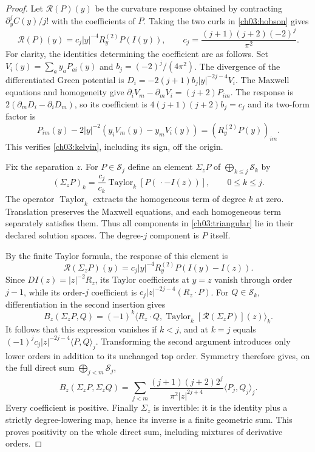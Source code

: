 \begin{proof}
Let $\mathcal R(P)(y)$ be the curvature response obtained by contracting
$\partial_y^j C(y)/j!$ with the coefficients of $P$. Taking the two
curls in \eqref{ch03:hobson} gives
\begin{equation}\label{ch03:kelvin}
 \mathcal R(P)(y)=c_j|y|^{-4}R_y^{(2)}P(I(y)),
 \qquad c_j=\frac{(j+1)(j+2)(-2)^j}{\pi^2}.
\end{equation}
For clarity, the identities determining the coefficient are as follows.
Set $V_i(y)=\sum_a y_aP_{ai}(y)$ and
$b_j=(-2)^j/(4\pi^2)$. The divergence of the differentiated Green
potential is
$D_i=-2(j+1)b_j|y|^{-2j-4}V_i$.
The Maxwell equations and homogeneity give
$\partial_iV_m-\partial_mV_i=(j+2)P_{im}$.
The response is $2(\partial_mD_i-\partial_iD_m)$, so its coefficient
is $4(j+1)(j+2)b_j=c_j$ and its two-form factor is
\[
 P_{im}(y)-2|y|^{-2}(y_iV_m(y)-y_mV_i(y))
   =(R_y^{(2)}P(y))_{im}.
\]
This verifies \eqref{ch03:kelvin}, including its sign, off the origin.

Fix the separation $z$. For $P\in\mathcal S_j$ define an element
$\Sigma_zP$ of $\bigoplus_{k\le j}\mathcal S_k$ by
\begin{equation}\label{ch03:triangular}
 (\Sigma_zP)_k
   =\frac{c_j}{c_k}\operatorname{Taylor}_k[P(\,\cdot-I(z))],
 \qquad 0\le k\le j.
\end{equation}
The operator $\operatorname{Taylor}_k$ extracts the homogeneous term of
degree $k$ at zero. Translation preserves the Maxwell equations, and
each homogeneous term separately satisfies them. Thus all components in
\eqref{ch03:triangular} lie in their declared solution spaces.
The degree-$j$ component is $P$ itself.

By the finite Taylor formula, the response of this element is
\[
 \mathcal R(\Sigma_zP)(y)
   =c_j|y|^{-4}R_y^{(2)}P(I(y)-I(z)).
\]
Since $DI(z)=|z|^{-2}R_z$, its Taylor coefficients at $y=z$ vanish
through order $j-1$, while its order-$j$ coefficient is
$c_j|z|^{-2j-4}(R_z\cdot P)$.
For $Q\in\mathcal S_k$, differentiation in the second insertion gives
\[
 B_z(\Sigma_zP,Q)
 =(-1)^k\big\langle R_z\cdot Q,
       \operatorname{Taylor}_k[\mathcal R(\Sigma_zP)](z)
                 \big\rangle_k.
\]
It follows that this expression vanishes if $k<j$, and at $k=j$ equals
$(-1)^jc_j|z|^{-2j-4}\langle P,Q\rangle_j$.
Transforming the second argument introduces only lower orders in addition
to its unchanged top order. Symmetry therefore gives, on the full direct sum $\bigoplus_{j<m}\mathcal S_j$,
\begin{equation}\label{ch03:diagonal-gram}
 B_z(\Sigma_zP,\Sigma_zQ)
 =\sum_{j<m}\frac{(j+1)(j+2)2^j}{\pi^2|z|^{2j+4}}
                  \langle P_j,Q_j\rangle_j.
\end{equation}
Every coefficient is positive. Finally $\Sigma_z$ is invertible:
it is the identity plus a strictly degree-lowering map, hence its inverse
is a finite geometric sum. This proves positivity on the whole direct sum,
including mixtures of derivative orders.
\end{proof}

